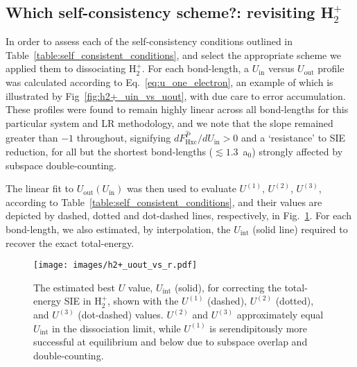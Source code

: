 \subsection{Which self-consistency scheme?: revisiting H$_2^+$}

In order to assess each of the self-consistency conditions outlined in 
Table~\ref{table:self_consistent_conditions}, 
and select the appropriate scheme  
we applied them to dissociating H$_2^+$.
%
For each bond-length, 
a $U_\textrm{in}$ versus $U_\textrm{out}$ 
profile was calculated 
according to Eq.~\ref{eq:u_one_electron},
an example of which is illustrated by Fig~\ref{fig:h2+_uin_vs_uout}, 
with due care to error accumulation.
% 
These profiles were found to remain highly linear 
across all bond-lengths 
for this particular system and LR methodology, 
and we note that the slope remained greater than $-1$ throughout,
signifying $d F_\textrm{Hxc}^{\hat{P}} / d U_\textrm{in}
> 0$ and a `resistance' to SIE reduction,
for all but the shortest bond-lengths 
($\lesssim 1.3$~a$_0$) 
strongly affected by subspace double-counting.
 
The linear fit to $U_\textrm{out} ( U_\textrm{in} )$
was then used to evaluate 
$U^{(1)}$, $U^{(2)}$, $U^{(3)}$,
according to Table~\ref{table:self_consistent_conditions}, 
and their values are depicted by 
dashed, dotted and dot-dashed lines, respectively, 
in Fig.~\ref{fig:h2+_uout_vs_r}.
%
For each bond-length, 
we also estimated, 
by interpolation, the $U_\textrm{int}$ (solid line)
required to recover the exact total-energy.
 
%
\begin{figure}[th!]
\centering
\texttt{[image: images/h2+\_uout\_vs\_r.pdf]}
\caption[Self-consistent $U_\textrm{out}$ schemes for H$_2^+$ vs best estimated $U$]
{The estimated best $U$ value,
$U_\textrm{int}$ (solid),  for correcting the total-energy
SIE in H$_2^+$, shown with the
$U^{(1)}$ (dashed), 
$U^{(2)}$ (dotted), and 
$U^{(3)}$ (dot-dashed) values.
%
$U^{(2)}$ and $U^{(3)}$  
approximately equal   $U_\textrm{int}$ 
in the dissociation limit, 
while $U^{(1)}$ is serendipitously 
more successful at equilibrium and below
due to  subspace overlap and double-counting.}
\label{fig:h2+_uout_vs_r}
\end{figure}
%
 

